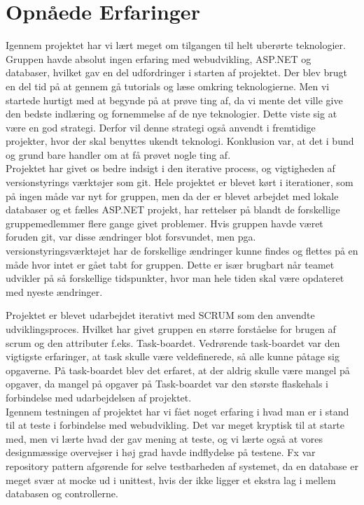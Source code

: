 \chapter{Opnåede Erfaringer}

Igennem projektet har vi lært meget om tilgangen til helt uberørte teknologier. Gruppen havde absolut ingen erfaring med webudvikling, ASP.NET og databaser, hvilket gav en del udfordringer i starten af projektet. Der blev brugt en del tid på at gennem gå tutorials og læse omkring teknologierne. Men vi startede hurtigt med at begynde på at prøve ting af, da vi mente det ville give den bedste indlæring og fornemmelse af de nye teknologier. Dette viste sig at være en god strategi. Derfor vil denne strategi også anvendt i fremtidige projekter, hvor der skal benyttes ukendt teknologi. Konklusion var, at det i bund og grund bare handler om at få prøvet nogle ting af.\\


Projektet har givet os bedre indsigt i den iterative process, og vigtigheden af versionstyrings værktøjer som git. Hele projektet er blevet kørt i iterationer, som på ingen måde var nyt for gruppen, men da der er blevet arbejdet med lokale databaser og et fælles ASP.NET projekt, har rettelser på blandt de forskellige gruppemedlemmer flere gange givet problemer. Hvis gruppen havde været foruden git, var disse ændringer blot forsvundet, men pga. versionstyringsværktøjet har de forskellige ændringer kunne findes og flettes på en måde hvor intet er gået tabt for gruppen. Dette er især brugbart når teamet udvikler på så forskellige tidspunkter, hvor man hele tiden skal være opdateret med nyeste ændringer.

Projektet er blevet udarbejdet iterativt med SCRUM som den anvendte udviklingsproces. Hvilket har givet gruppen en større forståelse for brugen af scrum og den attributer f.eks. Task-boardet. Vedrørende task-boardet var den vigtigste erfaringer, at task skulle være veldefinerede, så alle kunne påtage sig opgaverne. På task-boardet blev det erfaret, at der aldrig skulle være mangel på opgaver, da mangel på opgaver på Task-boardet var den største flaskehals i forbindelse med udarbejdelsen af projektet.\\

Igennem testningen af projektet har vi fået noget erfaring i hvad man er i stand til at teste i forbindelse med webudvikling. Det var meget kryptisk til at starte med, men vi lærte hvad der gav mening at teste, og vi lærte også at vores designmæssige overvejser i høj grad havde indflydelse på testene. Fx var repository pattern afgørende for selve testbarheden af systemet, da en database er meget svær at mocke ud i unittest, hvis der ikke ligger et ekstra lag i mellem databasen og controllerne.

